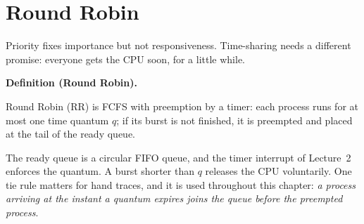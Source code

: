 \documentclass[11pt]{article}
\newenvironment{definitionbox}[1]{%
  \par\noindent\textbf{Definition (#1).}\ \itshape
}{\par\vspace{0.3em}}
\begin{document}
\section{Round Robin}

\noindent{}

\medskip
Priority fixes importance but not responsiveness. Time-sharing needs a different promise: everyone gets the CPU soon, for a little while.

\begin{definitionbox}{Round Robin}
Round Robin (RR) is FCFS with preemption by a timer: each process runs for at most one time quantum $q$; if its burst is not finished, it is preempted and placed at the tail of the ready queue.
\end{definitionbox}

The ready queue is a circular FIFO queue, and the timer interrupt of Lecture~2 enforces the quantum. A burst shorter than $q$ releases the CPU voluntarily. One tie rule matters for hand traces, and it is used throughout this chapter: \emph{a process arriving at the instant a quantum expires joins the queue before the preempted process}.
\end{document}
